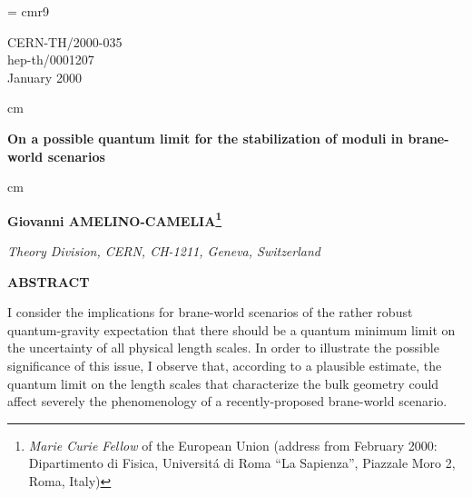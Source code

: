
\setlength{\textwidth}{152mm}
\setlength{\textheight}{215mm}
\addtolength{\oddsidemargin}{-2.5mm}
\addtolength{\topmargin}{-11mm}


\font\ninerm = cmr9

\def\footnoterule{\kern-3pt \hrule width \hsize \kern2.5pt}


\pagestyle{empty}

\begin{flushright}
CERN-TH/2000-035\\
hep-th/0001207 \\
$~$ \\
January 2000
\end{flushright}

 cm

\begin{center}
{\Large\bf On a possible quantum limit for the stabilization
of moduli in brane-world scenarios}
\end{center}
 cm
\begin{center}
{\bf Giovanni AMELINO-CAMELIA\footnote{{\it Marie Curie
Fellow} of the European Union
(address from February 2000: Dipartimento di Fisica,
Universit\'a di Roma ``La Sapienza'',
Piazzale Moro 2, Roma, Italy)}}
\end{center}
\begin{center}
{\it Theory Division, CERN, CH-1211, Geneva, Switzerland}
\end{center}

\vspace{1cm}
\begin{center}
{\bf ABSTRACT}
\end{center}

{\leftskip=0.6in \rightskip=0.6in

I consider the implications for brane-world scenarios 
of the rather robust quantum-gravity expectation that
there should be a quantum minimum limit
on the uncertainty of all physical length scales.
In order to illustrate the possible significance of this issue,
I observe that, according to a plausible estimate,
the quantum limit on the length scales that characterize the 
bulk geometry could affect severely the phenomenology of a
recently-proposed brane-world scenario.

}%

